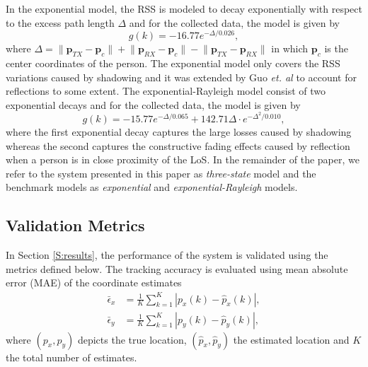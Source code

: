 \documentclass[journal, 10pt, twocolumn, balance]{IEEEtran}
\begin{document}
In the exponential model, the RSS is modeled to decay exponentially with respect to the excess path length $\Delta$ and for the collected data, the model is given by
\begin{equation}\label{eq:exponential_fading_model}
g(k) = -16.77 e^{-\Delta/0.026},
\end{equation}
where $\Delta = \lVert \boldsymbol{p}_{TX} - \boldsymbol{p}_{c}\rVert + \lVert \boldsymbol{p}_{RX} - \boldsymbol{p}_{c}\rVert - \lVert \boldsymbol{p}_{TX} - \boldsymbol{p}_{RX}\rVert$ in which $\boldsymbol{p}_{c}$ is the center coordinates of the person. The exponential model only covers the RSS variations caused by shadowing and it was extended by Guo \emph{et. al} \cite{Guo2013} to account for reflections to some extent. The exponential-Rayleigh model consist of two exponential decays and for the collected data, the model is given by 
\begin{equation}\label{eq:exponential_rayleigh_fading_model}
g(k) = -15.77 e^{-\Delta/0.065} + 142.71 \Delta \cdot e^{-\Delta^2/0.010},
\end{equation}
where the first exponential decay captures the large losses caused by shadowing whereas the second captures the constructive fading effects caused by reflection when a person is in close proximity of the LoS. In the remainder of the paper, we refer to the system presented in this paper as \emph{three-state} model and the benchmark models as \emph{exponential} and \emph{exponential-Rayleigh} models.



\subsection{Validation Metrics}

In Section \ref{S:results}, the performance of the system is validated using the metrics defined below. The tracking accuracy is evaluated using mean absolute error (MAE) of the coordinate estimates 
\begin{equation} \label{eq:coordinate_error}
\begin{aligned}
	\bar{\epsilon}_x &= \frac{1}{K} \displaystyle\sum\nolimits_{k=1}^K \left\lvert p_x(k) - \hat{p}_x(k) \right\rvert, \\
	\bar{\epsilon}_y &= \frac{1}{K} \displaystyle\sum\nolimits_{k=1}^K \left\lvert p_y(k) - \hat{p}_y(k) \right\rvert,
\end{aligned}
\end{equation}
where $(p_x,p_y)$ depicts the true location, $(\hat{p}_x,\hat{p}_y)$ the estimated location and $K$ the total number of estimates. 
\end{document}
